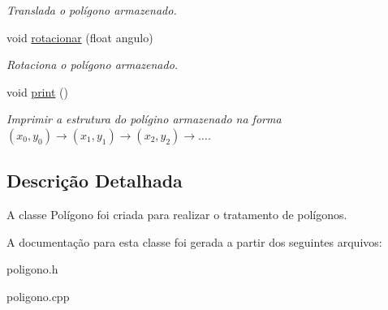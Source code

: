 \begin{DoxyCompactItemize}
\begin{DoxyCompactList}\small\item\em Translada o polígono armazenado. \end{DoxyCompactList}\item 
void \hyperlink{class_poligono_adaee71aa07241ba4e7f751a01163738a}{rotacionar} (float angulo)\hypertarget{class_poligono_adaee71aa07241ba4e7f751a01163738a}{}\label{class_poligono_adaee71aa07241ba4e7f751a01163738a}

\begin{DoxyCompactList}\small\item\em Rotaciona o polígono armazenado. \end{DoxyCompactList}\item 
void \hyperlink{class_poligono_ac22d76a087d08ea82627be416404ae15}{print} ()\hypertarget{class_poligono_ac22d76a087d08ea82627be416404ae15}{}\label{class_poligono_ac22d76a087d08ea82627be416404ae15}

\begin{DoxyCompactList}\small\item\em Imprimir a estrutura do polígino armazenado na forma $(x_0,y_0)→(x_1,y_1)→(x_2,y_2)→…$. \end{DoxyCompactList}\end{DoxyCompactItemize}


\subsection{Descrição Detalhada}
A classe Polígono foi criada para realizar o tratamento de polígonos. 

A documentação para esta classe foi gerada a partir dos seguintes arquivos\+:\begin{DoxyCompactItemize}
\item 
poligono.\+h\item 
poligono.\+cpp\end{DoxyCompactItemize}
